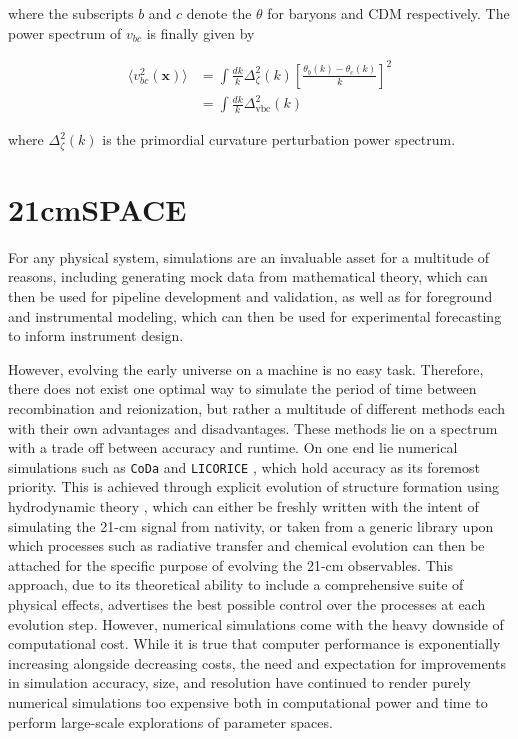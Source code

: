 \documentclass[floats,floatfix,showpacs,amssymb,prd,superscriptaddress,nofootinbib]{revtex4-2} %
\newcommand{\code}{\texttt}
\newcommand{\red}{\textcolor{red}}
\begin{document}
\noindent where the subscripts $b$ and $c$ denote the $\theta$ for baryons and CDM respectively. The power spectrum of $v_{bc}$ is finally given by 

\begin{equation}
\begin{split}
        \langle v_{bc}^2 (\textbf{x}) \rangle 
        & = \int \frac{dk}{k} \Delta_\zeta^2 (k) \left[ \frac{\theta_b (k) - \theta_c (k)}{k} \right]^2 \\
        & = \int \frac{dk}{k} \Delta_{\text{vbc}}^2 (k)
\end{split}
\end{equation}

\noindent where $\Delta_\zeta ^2 (k)$ is the primordial curvature perturbation power spectrum.

\newpage
\section{21cmSPACE}
For any physical system, simulations are an invaluable asset for a multitude of reasons, including generating mock data from mathematical theory, which can then be used for pipeline development and validation, as well as for foreground and instrumental modeling, which can then be used for experimental forecasting to inform instrument design. 

However, evolving the early universe on a machine is no easy task. Therefore, there does not exist one optimal way to simulate the period of time between recombination and reionization, but rather a multitude of different methods each with their own advantages and disadvantages. These methods lie on a spectrum with a trade off between accuracy and runtime. On one end lie numerical simulations such as \code{CoDa} \citep{Ocvirk_2015} and \code{LICORICE} \citep{Semelin_2017}, which hold accuracy as its foremost priority. This is achieved through explicit evolution of structure formation using hydrodynamic theory \citep{gessey-jones_thesis}, which can either be freshly written with the intent of simulating the 21-cm signal from nativity, or taken from a generic library upon which processes such as radiative transfer and chemical evolution can then be attached for the specific purpose of evolving the 21-cm observables. This approach, due to its theoretical ability to include a comprehensive suite of physical effects, advertises the best possible control over the processes at each evolution step. However, numerical simulations come with the heavy downside of computational cost. 
While it is true that computer performance is exponentially increasing alongside decreasing costs, the need and expectation for improvements in simulation accuracy, size, and resolution have continued to render purely numerical simulations too expensive both in computational power and time to perform large-scale explorations of parameter spaces.
\end{document}
